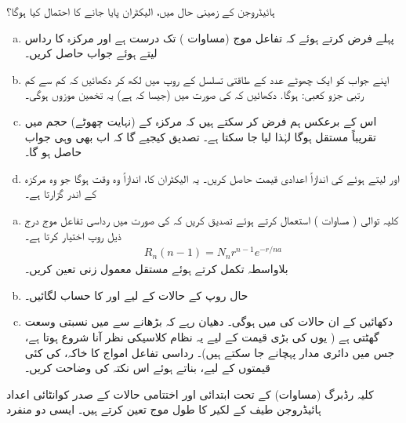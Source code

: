 ہائیڈروجن کے زمینی حال میں، الیکٹران پایا جانے کا احتمال کیا ہوگا؟ 
\begin{enumerate}[a.]
\item
پہلے فرض کرتے ہوئے کہ تفاعل موج (مساوات )  تک درست ہے اور مرکزہ کا رداس  لیتے ہوئے  جواب حاصل کریں۔ 
\item
اپنے جواب کو ایک چھوٹے عدد  کے طاقتی تسلسل کے روپ میں لکھ کر دکھائیں کہ کم سے کم رتبی جزو کعبی:  ہوگا. دکھائیں کہ  کی صورت میں (جیسا کہ ہے) یہ تخمین موزوں ہوگی۔
 \item
اس کے برعکس ہم فرض کر سکتے ہیں کہ مرکزہ کے (نہایت چھوٹے) حجم میں  تقریباً مستقل ہوگا لہٰذا  لیا جا سکتا ہے۔ تصدیق کیجیے گا کہ اب بھی وہی جواب حاصل ہو گا۔
\item
{} اور  لیتے ہوئے  کی اندازاً اعدادی قیمت حاصل کریں۔ یہ الیکٹران کا، اندازاً وہ وقت ہوگا جو وہ مرکزہ کے اندر گزارتا ہے۔ 
\end{enumerate}
\begin{enumerate}[a.]
\item
کلیہ توالی ( مساوات ) استعمال کرتے ہوئے تصدیق کریں کہ  کی صورت میں رداسی تفاعل موج درج ذیل روپ اختیار کرتا ہے۔ 
\begin{align*}
R_n (n - 1) = N_n r^{n - 1} e^{-r/na}
\end{align*}
بلاواسطہ تکمل کرتے ہوئے مستقل معمول زنی  تعین کریں۔
\item
حال  روپ کے حالات کے لیے  اور  کا حساب لگائیں۔
\item
دکھائیں کے ان حالات کی  میں   ہوگی۔ دھیان رہے کہ  بڑھانے سے  میں نسبتی وسعت گھٹتی ہے ( یوں  کی بڑی قیمت کے لیے یہ نظام کلاسیکی نظر آنا شروع ہوتا ہے، جس میں دائری مدار پہچانے جا سکتے ہیں)۔ رداسی تفاعل امواج کا خاکہ،  کی کئی قیمتوں کے لیے، بناتے ہوئے اس نکتہ کی وضاحت کریں۔
\end{enumerate}
\quad
 کلیہ رڈبرگ (مساوات) کے تحت ابتدائی اور اختتامی حالات کے صدر کوانٹائی اعداد ہائیڈروجن طیف کے لکیر کا طول موج تعین کرتے ہیں۔ ایسی دو منفرد
